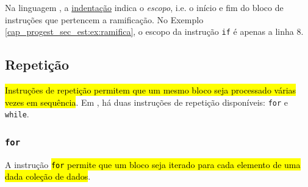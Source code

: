 \begin{obs}
  Na linguagem {\python}, a \href{https://pt.wikipedia.org/wiki/Indenta\%C3\%A7\%C3\%A3o}{indentação} indica o \emph{escopo}, i.e. o início e fim do bloco de instruções que pertencem a ramificação. No Exemplo \ref{cap_progest_sec_est:ex:ramifica}, o escopo da instrução \lstinline+if+ é apenas a linha 8.
\end{obs}

\subsection{Repetição}

\hl{Instruções de repetição permitem que um mesmo bloco seja processado várias vezes em sequência}. Em {\python}, há duas instruções de repetição disponíveis: \lstinline+for+ e \lstinline+while+. 

\subsubsection{\lstinline+for+}

A instrução \hl{{\lstinline+for+} permite que um bloco seja iterado para cada elemento de uma dada coleção de dados}.

